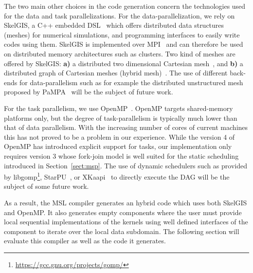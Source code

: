 The two main other choices in the code generation concern the technologies used for the data and task parallelizations.
For the data-parallelization, we rely on SkelGIS, a C++ embedded DSL~\cite{CPE:CPE3494} which offers distributed data structures (meshes) for numerical simulations, and programming interfaces to easily write codes using them.
SkelGIS is implemented over MPI~\cite{Graham2009MSE} and can therefore be used on distributed memory architectures such as clusters.
Two kind of meshes are offered by SkelGIS: \textbf{a)} a distributed two dimensional Cartesian mesh~\cite{DBLP:conf/ieeehpcs/HeleneS13}, and \textbf{b)} a distributed graph of Cartesian meshes (hybrid mesh)~\cite{DBLP:conf/europar/CoullonL14}.
The use of different back-ends for data-parallelism such as for example the distributed unstructured mesh proposed by PaMPA~\cite{lachat:hal-00768916} will be the subject of future work.

For the task parallelism, we use OpenMP~\cite{660313}.
OpenMP targets shared-memory platforms only, but the degree of task-parallelism is typically much lower than that of data parallelism.
With the increasing number of cores of current machines this has not proved to be a problem in our experience.
While the version 4 of OpenMP has introduced explicit support for tasks, our implementation only requires version 3 whose fork-join model is well suited for the static scheduling introduced in Section~\ref{sect:msp}.
The use of dynamic schedulers such as provided by libgomp\footnote{\url{https://gcc.gnu.org/projects/gomp/}}, StarPU~\cite{Augonnet2011}, or XKaapi~\cite{Gautier:2013:XRS:2510661.2511383} to directly execute the DAG will be the subject of some future work.

As a result, the MSL compiler generates an hybrid code which uses both SkelGIS and OpenMP.
It also generates empty components where the user must provide local sequential implementations of the kernels using well defined interfaces of the component to iterate over the local data subdomain.
The following section will evaluate this compiler as well as the code it generates.
